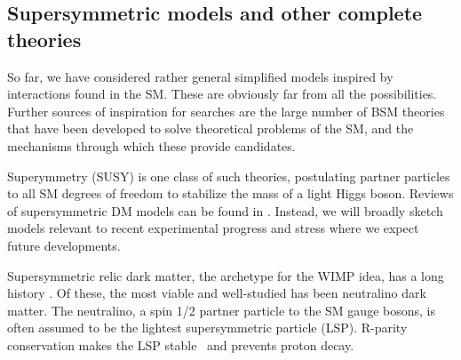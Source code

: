 
\subsection{Supersymmetric models and other complete theories}
\label{sec:SUSYModels}

So far, we have considered rather general simplified models inspired by interactions found in the SM. These are obviously far from all the possibilities. %
 Further sources of inspiration for searches are the large number of BSM theories that have been developed to solve theoretical problems of the SM, and the mechanisms through which these provide \IP candidates. 

Superymmetry (SUSY) is one class of such theories, postulating partner particles to all SM degrees of freedom to stabilize
the mass of a light Higgs boson.  
Reviews of supersymmetric DM models can be found in \cite{Feng:2010gw}. %
Instead, we will broadly sketch models relevant to
recent experimental progress and stress where we expect future developments. 

Supersymmetric relic dark matter, the archetype for the WIMP idea, has a long
history \cite{1984NuPhB.238..453E}. Of these, the most viable and well-studied has been neutralino dark matter. 
The neutralino, a spin 1/2 partner particle to the SM gauge bosons, is often assumed to be the lightest supersymmetric particle (LSP). 
R-parity conservation makes the LSP stable~\cite{Farrar:1978xj} and prevents proton decay. 

